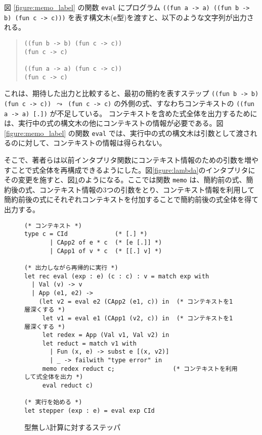 図 \ref{figure:memo_label} の関数 \texttt{eval} にプログラム \texttt{((fun a -> a) ((fun b -> b) (fun c -> c)))} を表す構文木(\texttt{e}型)を渡すと、以下のような文字列が出力される。

\begin{quote}
\begin{verbatim}
((fun b -> b) (fun c -> c))
(fun c -> c)

((fun a -> a) (fun c -> c))
(fun c -> c)
\end{verbatim}
\end{quote}

これは、期待した出力と比較すると、最初の簡約を表すステップ \texttt{((fun b -> b) (fun c -> c)) $\leadsto$ (fun c -> c)} の外側の式、すなわちコンテキストの \texttt{((fun a -> a) [.])} が不足している。
コンテキストを含めた式全体を出力するためには、実行中の式の構文木の他にコンテキストの情報が必要である。図 \ref{figure:memo_label} の関数 \texttt{eval} では、実行中の式の構文木は引数として渡されるのに対して、コンテキストの情報は得られない。

そこで、著者らは以前\cite{FCA2019}インタプリタ関数にコンテキスト情報のための引数を増やすことで式全体を再構成できるようにした。図\ref{figure:lambda}のインタプリタにその変更を施すと、図\ref{figure:lambda_stepper}のようになる。ここでは関数 \texttt{memo} は、簡約前の式、簡約後の式、コンテキスト情報の3つの引数をとり、コンテキスト情報を利用して簡約前後の式にそれぞれコンテキストを付加することで簡約前後の式全体を得て出力する。

\begin{figure}
\begin{verbatim}
(* コンテキスト *)
type c = CId             (* [.] *)
       | CApp2 of e * c  (* [e [.]] *)
       | CApp1 of v * c  (* [[.] v] *)

(* 出力しながら再帰的に実行 *)
let rec eval (exp : e) (c : c) : v = match exp with
  | Val (v) -> v
  | App (e1, e2) ->
    (let v2 = eval e2 (CApp2 (e1, c)) in  (* コンテキストを1層深くする *)
     let v1 = eval e1 (CApp1 (v2, c)) in  (* コンテキストを1層深くする *)
     let redex = App (Val v1, Val v2) in
     let reduct = match v1 with
       | Fun (x, e) -> subst e [(x, v2)]
       | _ -> failwith "type error" in
     memo redex reduct c;                (* コンテキストを利用して式全体を出力 *)
     eval reduct c)

(* 実行を始める *)
let stepper (exp : e) = eval exp CId
\end{verbatim}
\caption{型無し$\lambda$計算に対するステッパ}
\label{figure:lambda_stepper}
\end{figure}


